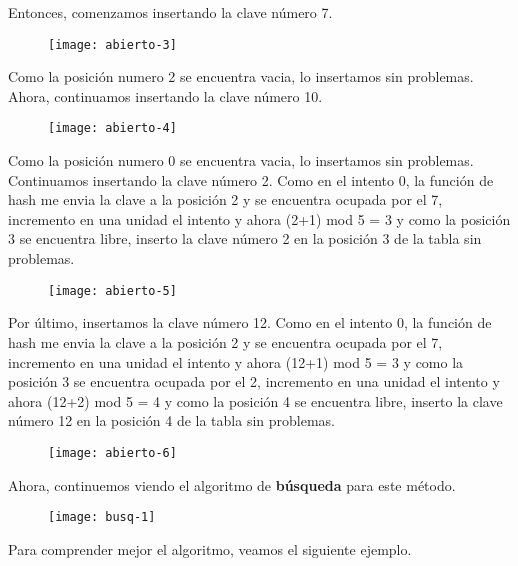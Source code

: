 \documentclass[10pt,a4paper]{article}
\begin{document}
Entonces, comenzamos insertando la clave número 7.
\newline
\begin{figure}[h]
	\centering
\texttt{[image: abierto-3]}
	\label{drivers1}
\end{figure}

Como la posición numero 2 se encuentra vacia, lo insertamos sin problemas.
\newpage
Ahora, continuamos insertando la clave número 10.
\newline
\begin{figure}[h]
	\centering
\texttt{[image: abierto-4]}
	\label{drivers1}
\end{figure}

Como la posición numero 0 se encuentra vacia, lo insertamos sin problemas.
\newline
\newline
Continuamos insertando la clave número 2. Como en el intento 0, la función de hash me envia la clave a la posición 2 y se encuentra ocupada por el 7, incremento en una unidad el intento y ahora (2+1) mod 5 = 3 y como la posición 3 se encuentra libre, inserto la clave número 2 en la posición 3 de la tabla sin problemas.
\newline
\begin{figure}[h]
	\centering
\texttt{[image: abierto-5]}
	\label{drivers1}
\end{figure}
\medskip
\medskip
Por último, insertamos la clave número 12. Como en el intento 0, la función de hash me envia la clave a la posición 2 y se encuentra ocupada por el 7, incremento en una unidad el intento y ahora (12+1) mod 5 = 3 y como la posición 3 se encuentra ocupada por el 2, incremento en una unidad el intento y ahora (12+2) mod 5 = 4 y como la posición 4 se encuentra libre, inserto la clave número 12 en la posición 4 de la tabla sin problemas.
\newline
\begin{figure}[h]
	\centering
\texttt{[image: abierto-6]}
	\label{drivers1}
\end{figure}
\newpage
Ahora, continuemos viendo el algoritmo de \textbf{búsqueda} para este método.
\newline
\begin{figure}[h]
	\centering
\texttt{[image: busq-1]}
	\label{drivers1}
\end{figure}
\medskip
\medskip
Para comprender mejor el algoritmo, veamos el siguiente ejemplo.
\newline
\end{document}
